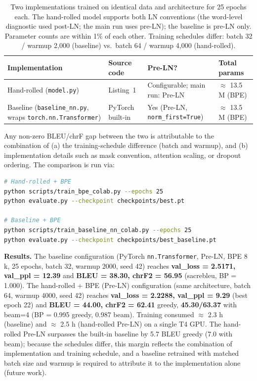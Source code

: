 \begin{table}[h]
\centering
\small
\begin{tabularx}{\textwidth}{X l l l}
\toprule
\textbf{Implementation} & \textbf{Source code} & \textbf{Pre-LN?} & \textbf{Total params} \\
\midrule
Hand-rolled (\texttt{model.py}) & Listing~1 & Configurable; main run: Pre-LN & $\approx$ 13.5 M (BPE) \\
Baseline (\texttt{baseline\_nn.py}, wraps \texttt{torch.nn.Transformer}) & PyTorch built-in & Yes (Pre-LN, \texttt{norm\_first=True}) & $\approx$ 13.5 M (BPE) \\
\bottomrule
\end{tabularx}
\caption{Two implementations trained on identical data and architecture for 25 epochs each. The hand-rolled model supports both LN conventions (the word-level diagnostic used post-LN; the main run uses pre-LN); the baseline is pre-LN only. Parameter counts are within 1\% of each other. Training schedules differ: batch 32 / warmup 2{,}000 (baseline) vs.\ batch 64 / warmup 4{,}000 (hand-rolled).}
\label{tab:baseline}
\end{table}

Any non-zero BLEU/chrF gap between the two is attributable to the combination of (a) the training-schedule difference (batch and warmup), and (b) implementation details such as mask convention, attention scaling, or dropout ordering. The comparison is run via:

\begin{lstlisting}[language=bash]
# Hand-rolled + BPE
python scripts/train_bpe_colab.py --epochs 25
python evaluate.py --checkpoint checkpoints/best.pt

# Baseline + BPE
python scripts/train_baseline_nn_colab.py --epochs 25
python evaluate.py --checkpoint checkpoints/best_baseline.pt
\end{lstlisting}

\textbf{Results.} The baseline configuration (PyTorch \texttt{nn.Transformer}, Pre-LN, BPE 8 k, 25 epochs, batch 32, warmup 2000, seed 42) reaches \textbf{val\_loss = 2.5171, val\_ppl = 12.39} and \textbf{BLEU = 38.30, chrF2 = 56.95} (sacrebleu, BP = 1.000). The hand-rolled + BPE (Pre-LN) configuration (same architecture, batch 64, warmup 4000, seed 42) reaches \textbf{val\_loss = 2.2288, val\_ppl = 9.29} (best epoch 22) and \textbf{BLEU = 44.00, chrF2 = 62.41} greedy, \textbf{45.30/63.37} with beam=4 (BP = 0.995 greedy, 0.987 beam). Training consumed $\approx$ 2.3 h (baseline) and $\approx$ 2.5 h (hand-rolled Pre-LN) on a single T4 GPU. The hand-rolled Pre-LN surpasses the built-in baseline by 5.7 BLEU greedy (7.0 with beam); because the schedules differ, this margin reflects the combination of implementation and training schedule, and a baseline retrained with matched batch size and warmup is required to attribute it to the implementation alone (future work).

